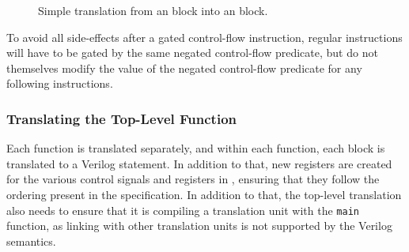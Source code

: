 \begin{figure}
  \centering
  \caption{Simple translation from an \rtlsubpar{} block into an \htl{} block.}%
  \label{fig:hg:htl-generation}
\end{figure}

To avoid all side-effects after a gated control-flow instruction, regular
instructions will have to be gated by the same negated control-flow predicate,
but do not themselves modify the value of the negated control-flow predicate for
any following instructions.


\subsubsection{Translating the Top-Level Function}

Each \rtlsubpar{} function is translated separately, and within each function,
each block is translated to a Verilog statement.  In addition to that, new
registers are created for the various control signals and registers in \htl{},
ensuring that they follow the ordering present in the \htl{} specification.  In
addition to that, the top-level translation also needs to ensure that it is
compiling a translation unit with the \texttt{main} function, as linking with
other translation units is not supported by the Verilog semantics.

